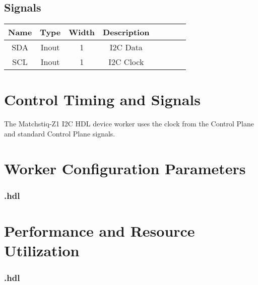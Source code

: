 \begin{landscape}
	\section*{Signals}
	\begin{scriptsize}
	\begin{tabular}{|c|c|c|c|p{2.6cm}|c|c|c|}
		\hline
		\rowcolor{blue}
		Name & Type  & Width & Description \\
		\hline
		SDA  & Inout & 1     & I2C Data    \\
		\hline
		SCL  & Inout & 1     & I2C Clock   \\
		\hline
	\end{tabular}
	\end{scriptsize}
\end{landscape}

\section*{Control Timing and Signals}
The Matchstiq-Z1 I2C HDL device worker uses the clock from the Control Plane and standard Control Plane signals.

\begin{landscape}
\section*{Worker Configuration Parameters}
\subsubsection*{\comp.hdl}
%
\section*{Performance and Resource Utilization}
\subsubsection*{\comp.hdl}
%
\end{landscape}
